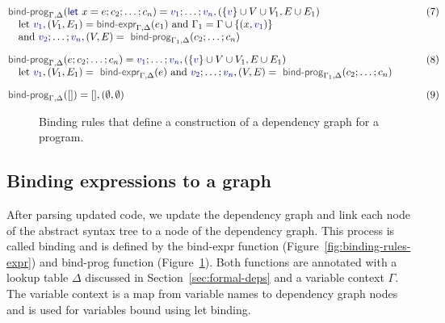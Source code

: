 \documentclass[acmsmall,anonymous,fleqn]{acmart}\settopmatter{printfolios=false,printccs=false,printacmref=false}
\theoremstyle{plain}
\theoremstyle{definition}
\newcommand{\ident}[1]{\textnormal{\textcolor{idclr}{\sffamily #1}}}
\newcommand{\kvd}[1]{\textnormal{\textcolor{kvdclr}{\sffamily #1}}}
\newcommand{\bndclr}[1]{\textcolor{kvdclr}{#1}}
\begin{document}

\begin{figure}[t]
\begin{equation*}
\hspace{-3.5em}
\begin{array}{ll}
\ident{bind-prog}_{\Gamma, \Delta}(\kvd{let}~x=e; c_2; \ldots; c_n) = \bndclr{v_1};\ldots;\bndclr{v_n}, (\{\bndclr{v}\} \cup V \cup V_1, E \cup E_1)
  \hspace{9.35em}&(7)\\
\quad \textnormal{let}~\bndclr{v_1}, (V_1,E_1) = \ident{bind-expr}_{\Gamma,\Delta}(e_1)~\textnormal{and}~\Gamma_1 = \Gamma \cup \{(x,\bndclr{v_1})\} \\
\quad \textnormal{and}~\bndclr{v_2}; \ldots; \bndclr{v_n}, (V, E) = \ident{bind-prog}_{\Gamma_1, \Delta}(c_2; \ldots; c_n)
\\[1em]
\ident{bind-prog}_{\Gamma, \Delta}(e; c_2; \ldots; c_n) = \bndclr{v_1};\ldots;\bndclr{v_n}, (\{\bndclr{v}\} \cup V \cup V_1, E \cup E_1)&(8)\\
\quad \textnormal{let}~\bndclr{v_1}, (V_1,E_1) = \ident{bind-expr}_{\Gamma,\Delta}(e)
~\textnormal{and}~\bndclr{v_2}; \ldots; \bndclr{v_n}, (V, E) = \ident{bind-prog}_{\Gamma_1, \Delta}(c_2; \ldots; c_n)
\\[1em]
\ident{bind-prog}_{\Gamma, \Delta}([]) = [], (\emptyset, \emptyset)&(9)
\end{array}
\end{equation*}
\caption{Binding rules that define a construction of a dependency graph for a program.}
\label{fig:binding-rules-prog}
\end{figure}



\subsection{Binding expressions to a graph}
\label{sec:formal-bind}

After parsing updated code, we update the dependency graph and link each node of the abstract
syntax tree to a node of the dependency graph. This process is called
binding and is defined by the \ident{bind-expr} function (Figure~\ref{fig:binding-rules-expr})
and \ident{bind-prog} function (Figure~\ref{fig:binding-rules-prog}). Both functions are
annotated with a lookup table $\Delta$ discussed in Section~\ref{sec:formal-deps} and a variable
context $\Gamma$. The variable context is a map from variable names to dependency graph nodes and
is used for variables bound using \kvd{let} binding.
\end{document}
